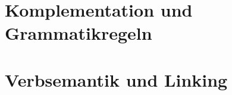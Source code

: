 \documentclass[handout,aspectratio=1610,dvipsnames]{beamer}
\begin{document}
  \section{Komplementation und Grammatikregeln}
  \let\woopsi\section\let\section\subsection\let\subsection\subsubsection
  
  \let\subsection\section\let\section\woopsi

  \section{Verbsemantik und Linking}
  \let\woopsi\section\let\section\subsection\let\subsection\subsubsection
  
  \let\subsection\section\let\section\woopsi
\end{document}
